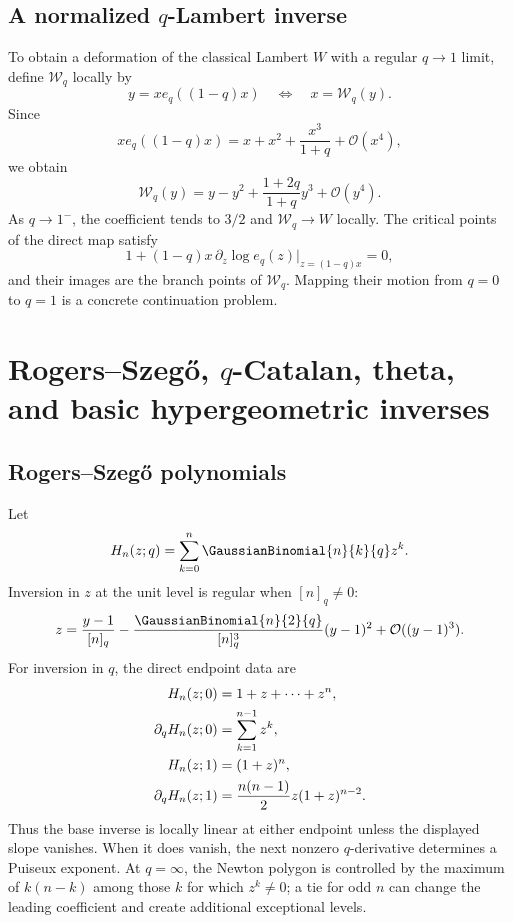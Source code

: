 \documentclass[11pt,oneside]{book}
\theoremstyle{definition}
\theoremstyle{remark}
\newcommand{\OO}{\mathcal{O}}
\begin{document}
\section{A normalized $q$-Lambert inverse}
To obtain a deformation of the classical Lambert $W$ with a regular
$q\to1$ limit, define $\mathcal W_q$ locally by
\begin{equation}\label{eq:qLambert-def}
 y=x e_q((1-q)x)
 \quad\Longleftrightarrow\quad x=\mathcal W_q(y).
\end{equation}
Since
\[
 x e_q((1-q)x)=x+x^2+\frac{x^3}{1+q}+\OO(x^4),
\]
we obtain
\begin{equation}\label{eq:qLambert-series}
 \mathcal W_q(y)=y-y^2+\frac{1+2q}{1+q}y^3+\OO(y^4).
\end{equation}
As $q\to1^-$, the coefficient tends to $3/2$ and
$\mathcal W_q\to W$ locally.  The critical points of the direct map satisfy
\[
 1+(1-q)x\,\partial_z\log e_q(z)\big|_{z=(1-q)x}=0,
\]
and their images are the branch points of $\mathcal W_q$.  Mapping their
motion from $q=0$ to $q=1$ is a concrete continuation problem.

\chapter{Rogers--Szeg\H{o}, $q$-Catalan, theta, and basic hypergeometric inverses}

\section{Rogers--Szeg\H{o} polynomials}
Let
\[
 H_n(z;q)=\sum_{k=0}^n\GaussianBinomial{n}{k}{q}z^k.
\]
Inversion in $z$ at the unit level is regular when $[n]_q\ne0$:
\begin{equation}\label{eq:rogers-z-inverse}
 z=\frac{y-1}{[n]_q}
 -\frac{\GaussianBinomial{n}{2}{q}}{[n]_q^3}(y-1)^2
 +\OO((y-1)^3).
\end{equation}
For inversion in $q$, the direct endpoint data are
\begin{align}
 H_n(z;0)&=1+z+\cdots+z^n,\notag\\
 \partial_qH_n(z;0)&=\sum_{k=1}^{n-1}z^k,\label{eq:rogers-qzero-data}\\
 H_n(z;1)&=(1+z)^n,\notag\\
 \partial_qH_n(z;1)&=\frac{n(n-1)}2z(1+z)^{n-2}.
 \label{eq:rogers-qone-data}
\end{align}
Thus the base inverse is locally linear at either endpoint unless the displayed
slope vanishes.  When it does vanish, the next nonzero $q$-derivative determines
a Puiseux exponent.  At $q=\infty$, the Newton polygon is controlled by the
maximum of $k(n-k)$ among those $k$ for which $z^k\ne0$; a tie for odd $n$
can change the leading coefficient and create additional exceptional levels.
\end{document}

